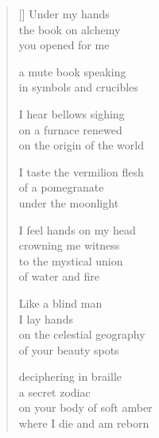 \documentclass[12pt]{article}
\begin{document}
\thispagestyle{empty}


\settowidth{\versewidth}{on your body of soft amber}

\bigskip

\begin{verse}[\versewidth]
  Under my hands \\
  the book on alchemy \\
  you opened for me

  a mute book speaking \\
  in symbols and crucibles

  I hear bellows sighing \\
  on a furnace renewed \\
  on the origin of the world

  I taste the vermilion flesh \\
  of a pomegranate \\
  under the moonlight

  I feel hands on my head \\
  crowning me witness \\
  to the mystical union \\
  of water and fire

  Like a blind man \\
  I lay hands \\
  on the celestial geography \\
  of your beauty spots

  deciphering in braille \\
  a secret zodiac \\
  on your body of soft amber \\
  where I die and am reborn
\end{verse}
\end{document}
